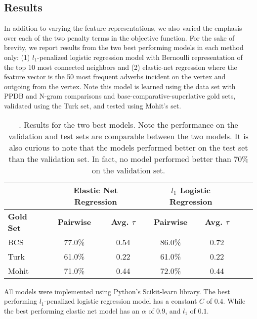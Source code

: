 \subsection{Results}

In addition to varying the feature representations, we also varied the emphasis over each of the two penalty terms in the objective function. For the sake of brevity, we report results from the two best performing models in each method only: (1) $l_1$-penalized logistic regression model with Bernoulli representation of the top 10 most connected neighbors and (2) elastic-net regression where the feature vector is the 50 most frequent adverbs incident on the vertex and outgoing from the vertex. Note this model is learned using the data set with PPDB and N-gram comparisons and base-comparative-superlative gold sets, validated using the Turk set, and tested using Mohit's set.

\begin{table}
\small
\centering
\begin{tabular}{|l|cc|cc|cc|}
	\hline 
	& \multicolumn{2}{c|}{Elastic Net Regression } 
	& \multicolumn{2}{c|}{$l_1$ Logistic Regression} \\
	\hline 
	\bf Gold Set
	& \bf Pairwise & \bf Avg. $\tau$  
	& \bf Pairwise & \bf Avg. $\tau$  \\ 
	\hline
	BCS   & 77.0\% & 0.54 & 86.0\%  &  0.72 \\
	Turk  & 61.0\% & 0.22 & 61.0\%  &  0.22 \\
	Mohit & 71.0\% & 0.44 & 72.0\%  &  0.44 \\
	\hline
\end{tabular}
\caption{\label{font-table}. Results for the two best models. Note the performance on the validation and test sets are comparable between the two models. It is also curious to note that the models performed better on the test set than the validation set. In fact, no model performed better than $70\%$ on the validation set. }
\end{table}


All models were implemented using Python's Scikit-learn library. The best performing $l_1$-penalized logistic regression model has a constant $C$ of $0.4$. While the best performing elastic net model has an $\alpha$ of $0.9$, and $l_1$ of $0.1$.

















